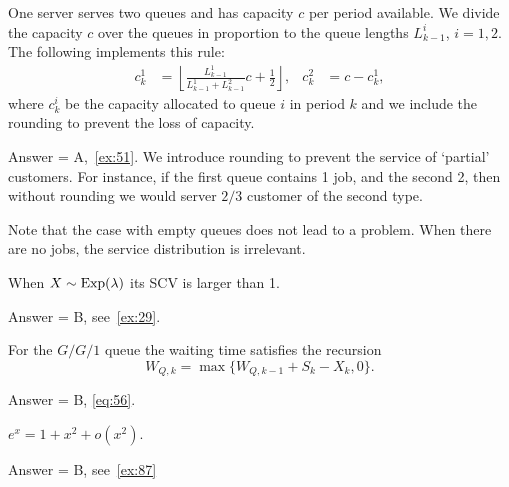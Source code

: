 \begin{exercise}[201904]
  One server serves two queues and has capacity $c$ per period available.
  We divide the capacity $c$ over the queues in proportion to the queue lengths $L^i_{k-1}$, $i=1,2$.
  The following implements this rule:
    \begin{align*}
      c_k^1 &= \left\lfloor \frac{L_{k-1}^1}{L_{k-1}^1 + L_{k-1}^2} c + \frac 1 2 \right\rfloor, & c_k^2 &= c - c_k^1,
    \end{align*}
    where $c_k^i$ be the capacity allocated to queue $i$ in period $k$ and we include the rounding to prevent the loss of capacity.

\begin{solution}
      Answer =  A,~\cref{ex:51}.
      We introduce rounding to prevent the service of `partial' customers.
      For instance, if the first queue contains 1 job, and the second 2, then without rounding we would server $2/3$ customer of the second type.

      Note that the case with empty queues does not lead to a problem.
      When there are no jobs, the service distribution is irrelevant.
\end{solution}
\end{exercise}


\begin{exercise}[201904]
When  $X\sim\operatorname{Exp}(\lambda)$ its SCV is larger than 1.
\begin{solution} Answer =  B, see~\cref{ex:29}.
\end{solution}
\end{exercise}

\begin{exercise}[201904]
  For the $G/G/1$ queue the waiting time satisfies the recursion
  \begin{equation*}
  W_{Q,k} = \max\{W_{Q,k-1} + S_{k}-X_k, 0\}.
  \end{equation*}
\begin{solution} Answer =  B, \eqref{eq:56}.
\end{solution}
\end{exercise}


\begin{exercise}[201907]
$e^{x} = 1 +x^2 + o(x^2)$.
\begin{solution}
Answer =  B, see~\cref{ex:87}
\end{solution}
\end{exercise}


